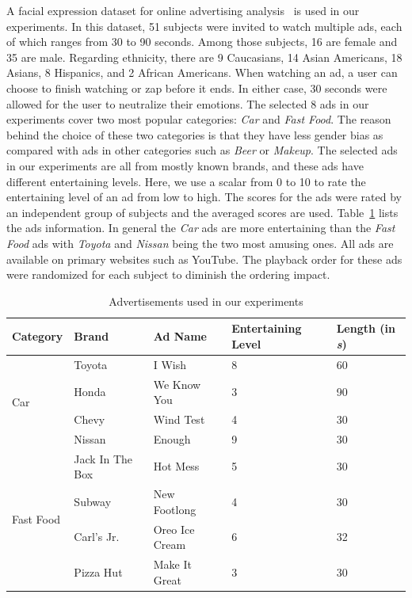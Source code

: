 \documentclass[twoside,leqno,twocolumn]{article}
\begin{document}
A facial expression dataset for online advertising analysis~\cite{Yang_FG15} is used in our experiments. In this dataset, 51 subjects were invited to watch multiple ads, each of which ranges from 30 to 90 seconds. Among those subjects, 16 are female and 35 are male. Regarding ethnicity, there are 9 Caucasians, 14 Asian Americans, 18 Asians, 8 Hispanics, and 2 African Americans. When watching an ad, a user can choose to finish watching or zap before it ends. In either case, 30 seconds were allowed for the user to neutralize their emotions. The selected 8 ads in our experiments cover two most popular categories: \textit{Car} and \textit{Fast Food}. The reason behind the choice of these two categories is that they have less gender bias as compared with ads in other categories such as \textit{Beer} or \textit{Makeup}. The selected ads in our experiments are all from mostly known brands, and these ads have different entertaining levels. Here, we use a scalar from 0 to 10 to rate the entertaining level of an ad from low to high. The scores for the ads were rated by an independent group of subjects and the averaged scores are used. Table~\ref{table:ads} lists the ads information. In general the \textit{Car} ads are more entertaining than the \textit{Fast Food} ads with \textit{Toyota} and \textit{Nissan} being the two most amusing ones. All ads are available on primary websites such as YouTube. The playback order for these ads were randomized for each subject to diminish the ordering impact. 

\begin{table}[!t]
\caption{Advertisements used in our experiments} \label{table:ads}
\centering
\begin{tabular}{lllll}
\toprule
Category & Brand & Ad Name & Entertaining Level & Length (in \textit{s}) \\ \midrule

\multirow{4}{*}{Car}        & Toyota & I Wish  & 8 & 60			\\ %
                            & Honda  & We Know You  & 3 & 90 \\ %
                            & Chevy  & Wind Test  & 4 & 30  \\ %
                            & Nissan & Enough   & 9 & 30    \\ %
\midrule 
\multirow{4}{*}{Fast Food} & Jack In The Box & Hot Mess               & 5 &  30 \\ %
                            & Subway                & New Footlong    & 4 & 30 \\ %
                            & Carl's Jr.            & Oreo Ice Cream  & 6 &  32 \\ %
                            & Pizza Hut             & Make It Great   & 3 & 30 \\ %
\bottomrule
\end{tabular}
\end{table} 
\end{document}
